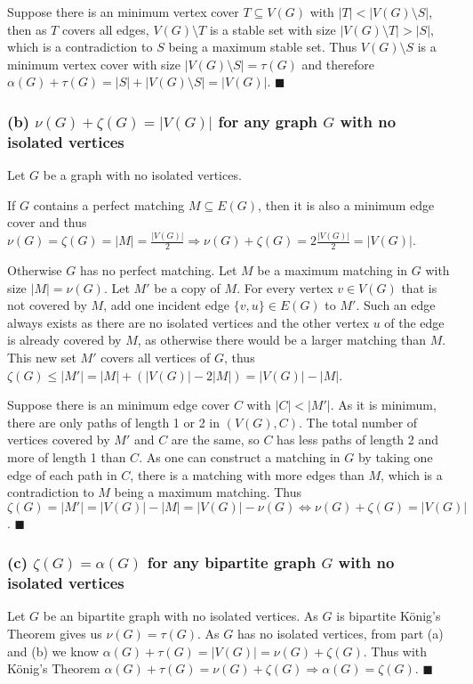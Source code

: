 \documentclass{article}
\begin{document}
Suppose there is an minimum vertex cover $T\subseteq V(G)$ with $|T|<|V(G)\setminus S|$, then as $T$ covers all edges, $V(G)\setminus T$ is a stable set with size $|V(G)\setminus T|>|S|$, which is a contradiction to $S$ being a maximum stable set. Thus $V(G)\setminus S$ is a minimum vertex cover with size $|V(G)\setminus S|=\tau(G)$ and therefore $\alpha(G) + \tau(G)= |S|+ |V(G)\setminus S| = |V(G)|$. $\blacksquare$

\subsubsection*{(b) $\nu(G) + \zeta(G) = |V(G)|$ for any graph $G$ with no isolated vertices}
Let $G$ be a graph with no isolated vertices.

If $G$ contains a perfect matching $M\subseteq E(G)$, then it is also a minimum edge cover and thus $\nu(G)=\zeta(G)=|M|=\frac{|V(G)|}{2} \Rightarrow \nu(G) + \zeta(G)= 2 \frac{|V(G)|}{2} = |V(G)|$.

Otherwise $G$ has no perfect matching. Let $M$ be a maximum matching in $G$  with size $|M|=\nu(G)$. Let $M'$ be a copy of $M$. For every vertex $v\in V(G)$ that is not covered by $M$, add one incident edge $\{v,u\}\in E(G)$ to $M'$. Such an edge always exists as there are no isolated vertices and the other vertex $u$ of the edge is already covered by $M$, as otherwise there would be a larger matching than $M$. This new set $M'$ covers all vertices of $G$, thus $\zeta(G)\leq|M'|=|M|+(|V(G)|-2|M|)=|V(G)|-|M|$.

Suppose there is an minimum edge cover $C$ with $|C|<|M'|$. As it is minimum, there are only paths of length 1 or 2 in $(V(G), C)$. The total number of vertices covered by $M'$ and $C$ are the same, so $C$ has less paths of length 2 and more of length 1 than $C$. As one can construct a matching in $G$ by taking one edge of each path in $C$, there is a matching with more edges than $M$, which is a contradiction to $M$ being a maximum matching. Thus $\zeta(G)=|M'|=|V(G)|-|M|=|V(G)| -\nu(G) \Leftrightarrow \nu(G) + \zeta(G) = |V(G)|$. $\blacksquare$

\subsubsection*{(c) $\zeta(G) = \alpha(G)$ for any bipartite graph $G$ with no isolated vertices}
Let $G$ be an bipartite graph with no isolated vertices. As $G$ is bipartite König’s Theorem gives us $\nu (G)=\tau(G)$. As $G$ has no isolated vertices, from part (a) and (b) we know $\alpha(G) + \tau(G) = |V(G)|= \nu(G) + \zeta(G)$. Thus with König's Theorem $\alpha(G) + \tau(G) = \nu(G) + \zeta(G) \Rightarrow \alpha(G) = \zeta(G)$. $\blacksquare$
\end{document}
